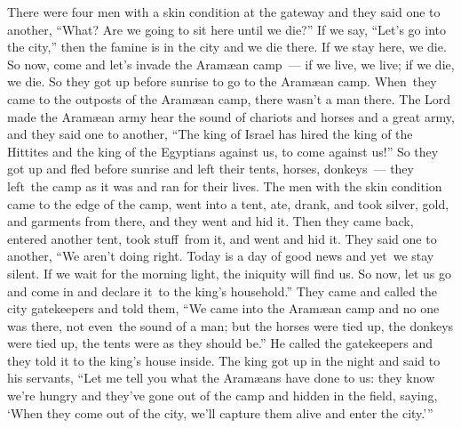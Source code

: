 \begin{inparaenum}
   There were four men with a skin condition at the gateway and they said one to another, ``What? Are we going to sit here until we die?''%
   If we say, ``Let's go into the city,'' then the famine is in the city and we die there. If we stay here, we die. So now, come and let's invade the Aram\ae{}an camp~--- if we live, we live; if we die, we die.%
   So they got up before sunrise to go to the Aram\ae{}an camp. When\understood{}\ they came to the outposts of the Aram\ae{}an camp, there wasn't a man there.%
   The Lord made the Aram\ae{}an army hear the sound of chariots and horses and a great army, and they said one to another, ``The king of Israel has hired the king of the Hittites and the king of the Egyptians against us, to come against us!''%
   So they got up and fled before sunrise and left their tents, horses, donkeys~--- they left\understood{}\ the camp as it was and ran for their lives.%
   The men with the skin condition came to the edge of the camp, went into a tent, ate, drank, and took silver, gold, and garments from there, and they went and hid it. Then they came back, entered another tent, took stuff\understood{}\ from it, and went and hid it.%
   They said one to another, ``We aren't doing right. Today is a day of good news and yet\understood{}\ we stay silent. If we wait for the morning light, the iniquity will find us. So now, let us go and come in and declare it\understood{}\ to the king's household.''%
   They came and called the city gatekeepers and told them, ``We came into the Aram\ae{}an camp and no one was there, not even\understood{}\ the sound of a man; but the horses were tied up, the donkeys were tied up, the tents were as they should be.''\thinspace\understood{}%
   He called the gatekeepers and they told it to the king's house inside.%
   The king got up in the night and said to his servants, ``Let me tell you what the Aram\ae{}ans have done to us: they know we're hungry and they've gone out of the camp and hidden in the field, saying, `When they come out of the city, we'll capture them alive and enter the city.'\thinspace''%

\end{inparaenum}
